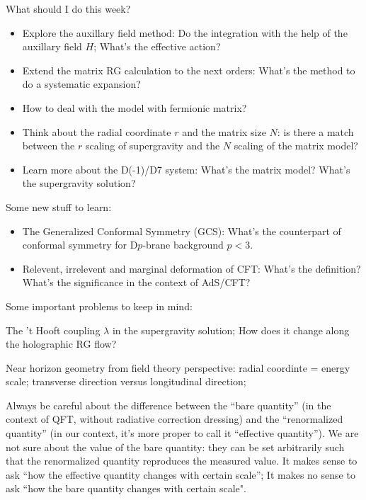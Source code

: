 \newpage

\begin{todo}
	What should I do this week?
	\begin{itemize}
		\item Explore the auxillary field method:
			Do the integration with the help of the auxillary field $H$;
			What's the effective action?
		\item Extend the matrix RG calculation to the next orders:
			What's the method to do a systematic expansion?
		\item How to deal with the model with fermionic matrix?
		\item Think about the radial coordinate $r$ and the matrix size $N$:
			is there a match between the $r$ scaling of supergravity
			and the $N$ scaling of the matrix model?
		\item Learn more about the D(-1)/D7 system:
			What's the matrix model?
			What's the supergravity solution?
	\end{itemize}
	Some new stuff to learn:
	\begin{itemize}
		\item The Generalized Conformal Symmetry (GCS):
			What's the counterpart of conformal symmetry for D$p$-brane
			background $p<3$.
		\item Relevent, irrelevent and marginal deformation of CFT:
			What's the definition?
			What's the significance in the context of AdS/CFT?
	\end{itemize}
\end{todo}

Some important problems to keep in mind:

\begin{problem}
	The 't Hooft coupling $\lambda$ in the supergravity solution;
	How does it change along the holographic RG flow?
\end{problem}

\begin{problem}
	Near horizon geometry from field theory perspective:
	radial coordinte = energy scale;
	transverse direction versus longitudinal direction;
\end{problem}

\begin{problem}
	Always be careful about the difference between the ``bare quantity''
	(in the context of QFT, without radiative correction dressing)
	and the ``renormalized quantity''
	(in our context, it's more proper to call it ``effective quantity'').
	We are not sure about the value of the bare quantity:
	they can be set arbitrarily such that the renormalized quantity
	reproduces the measured value.
	It makes sense to ask ``how the effective quantity changes with
	certain scale'';
	It makes no sense to ask ``how the bare quantity changes with
	certain scale".
\end{problem}

